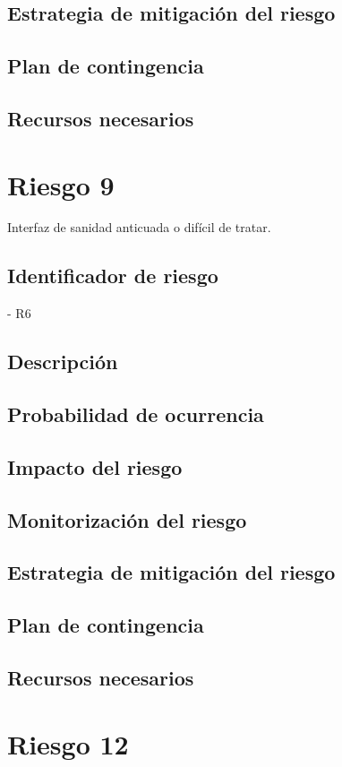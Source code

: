 \subsection{Estrategia de mitigación del riesgo}
\subsection{Plan de contingencia}
\subsection{Recursos necesarios}

\section{Riesgo 9}

Interfaz de sanidad anticuada o difícil de tratar.

\subsection{Identificador de riesgo}
- R6
\subsection{Descripción}
\subsection{Probabilidad de ocurrencia}
\subsection{Impacto del riesgo}
\subsection{Monitorización del riesgo}
\subsection{Estrategia de mitigación del riesgo}
\subsection{Plan de contingencia}
\subsection{Recursos necesarios}

\section{Riesgo 12}

